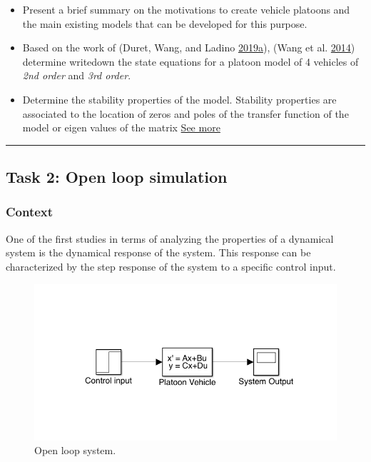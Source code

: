 \documentclass[]{book}
\providecommand{\tightlist}{%
  \setlength{\itemsep}{0pt}\setlength{\parskip}{0pt}}
\theoremstyle{definition}
\theoremstyle{definition}
\theoremstyle{definition}
\theoremstyle{remark}
\begin{document}
\begin{itemize}
\tightlist
\item
  Present a brief summary on the motivations to create vehicle platoons
  and the main existing models that can be developed for this purpose.
\item
  Based on the work of (Duret, Wang, and Ladino
  \protect\hyperlink{ref-Duret2019:ISTTT}{2019}\protect\hyperlink{ref-Duret2019:ISTTT}{a}),
  (Wang et al. \protect\hyperlink{ref-Meng2014b:TR-C}{2014}) determine
  writedown the state equations for a platoon model of 4 vehicles of
  \emph{2nd order} and \emph{3rd order}.\\
\item
  Determine the stability properties of the model. Stability properties
  are associated to the location of zeros and poles of the transfer
  function of the model or eigen values of the matrix
  \href{https://en.wikipedia.org/wiki/Stability_theory}{See more}
\end{itemize}

\begin{center}\rule{0.5\linewidth}{\linethickness}\end{center}

\hypertarget{task-2-open-loop-simulation}{%
\subsection*{Task 2: Open loop
simulation}\label{task-2-open-loop-simulation}}

\hypertarget{context-6}{%
\subsubsection*{Context}\label{context-6}}

One of the first studies in terms of analyzing the properties of a
dynamical system is the dynamical response of the system. This response
can be characterized by the step response of the system to a specific
control input.



\begin{figure}

{\centering \includegraphics{images/p2-02-control-open} 

}

\caption{Open loop system.}\label{fig:opencav}
\end{figure}
\end{document}
